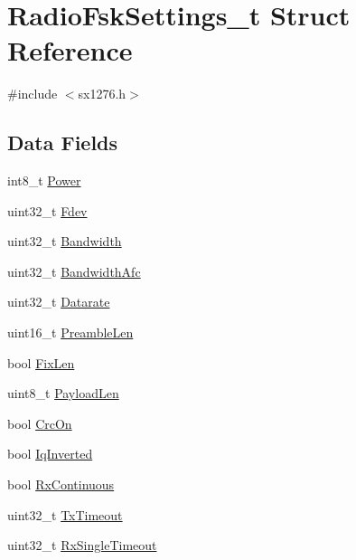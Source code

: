 \hypertarget{structRadioFskSettings__t}{}\section{Radio\+Fsk\+Settings\+\_\+t Struct Reference}
\label{structRadioFskSettings__t}


{\ttfamily \#include $<$sx1276.\+h$>$}

\subsection*{Data Fields}
\begin{DoxyCompactItemize}
\item 
int8\+\_\+t \hyperlink{structRadioFskSettings__t_ab149ce9b6cef37f6d06cc9196af0c4fc}{Power}
\item 
uint32\+\_\+t \hyperlink{structRadioFskSettings__t_ad3848ad0938d9668710ff78b0f3ee36f}{Fdev}
\item 
uint32\+\_\+t \hyperlink{structRadioFskSettings__t_a357f643a26a7a073a1ef9e202aa06923}{Bandwidth}
\item 
uint32\+\_\+t \hyperlink{structRadioFskSettings__t_aae6deb8c8416c353802a9ebb32570963}{Bandwidth\+Afc}
\item 
uint32\+\_\+t \hyperlink{structRadioFskSettings__t_aace55af85a24678b07f063a98cc6d125}{Datarate}
\item 
uint16\+\_\+t \hyperlink{structRadioFskSettings__t_aa0098690cc24c7e90c72c74e17fedc9a}{Preamble\+Len}
\item 
bool \hyperlink{structRadioFskSettings__t_a9aa697da87ba6f407d8eead555f175f0}{Fix\+Len}
\item 
uint8\+\_\+t \hyperlink{structRadioFskSettings__t_a645bbf583dd549c7a9f79b27ca82f4a7}{Payload\+Len}
\item 
bool \hyperlink{structRadioFskSettings__t_abf1d8c1b3c3e0f00b1b249391a974d7d}{Crc\+On}
\item 
bool \hyperlink{structRadioFskSettings__t_a848026c9254cf5c6cd08c77c19b044ac}{Iq\+Inverted}
\item 
bool \hyperlink{structRadioFskSettings__t_a5014dff06f0f036dc18d2c3f8635351e}{Rx\+Continuous}
\item 
uint32\+\_\+t \hyperlink{structRadioFskSettings__t_a56a8b5f41a508b7a96773141b9bfcd29}{Tx\+Timeout}
\item 
uint32\+\_\+t \hyperlink{structRadioFskSettings__t_a841e0bdfdc056f7afeab744edb28d384}{Rx\+Single\+Timeout}
\end{DoxyCompactItemize}


